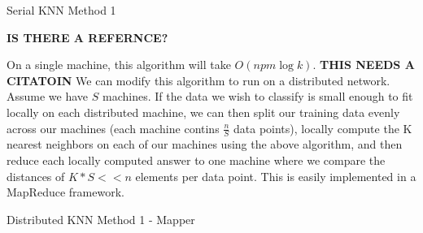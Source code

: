 \begin{algorithm}
\DontPrintSemicolon
{}
\caption{Serial KNN Method 1\label{KNN1}}
\end{algorithm}

\textbf{IS THERE A REFERNCE?}

\vspace{5 mm}
\noindent
On a single machine, this algorithm will take $O(n p m \log k)$. 
\textbf{THIS NEEDS A CITATOIN} 
We can modify this algorithm to run on a distributed network. Assume we have 
$S$ machines. If the data we wish to classify is small enough to fit locally on 
each distributed machine, we can then split our training data evenly across our 
machines (each machine contins $\frac{n}{S}$ data points), locally compute 
the K nearest neighbors on each of our machines using the above algorithm, and 
then reduce each locally computed answer to one machine where we compare the 
distances of $K * S << n$ elements per data point. This is easily implemented 
in a MapReduce framework.

\begin{algorithm}
\DontPrintSemicolon
{}
\caption{Distributed KNN Method 1 - Mapper\label{KNN1m}}
\end{algorithm}

